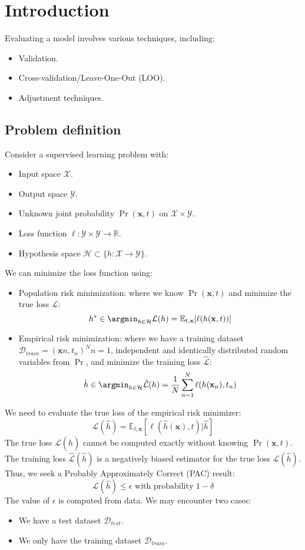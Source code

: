\section{Introduction}

Evaluating a model involves various techniques, including:
\begin{itemize}
    \item Validation.
    \item Cross-validation/Leave-One-Out (LOO).
    \item Adjustment techniques.
\end{itemize}

\subsection{Problem definition}
Consider a supervised learning problem with:
\begin{itemize}
    \item Input space $\mathcal{X}$.
    \item Output space $\mathcal{Y}$.
    \item Unknown joint probability $\Pr(\mathbf{x}, t)$ on $\mathcal{X} \times \mathcal{Y}$.
    \item Loss function $\ell: \mathcal{Y} \times \mathcal{Y}\rightarrow \mathbb{R}$.
    \item Hypothesis space $\mathcal{H} \subset \{h : \mathcal{X} \rightarrow \mathcal{Y}\}$.
\end{itemize}
We can minimize the loss function using:
\begin{itemize}
    \item Population risk minimization: where we know $\Pr(\mathbf{x}, t)$ and minimize the true loss $\mathcal{L}$:
        \[h^\ast\in\argmin_{h\in\mathcal{H}}\mathcal{L}(h)=\mathbb{E}_{t,\mathbf{x}}[\ell(h(\mathbf{x},t))]\]
    \item Empirical risk minimization: where we have a training dataset $\mathcal{D}_{train}={(\mathbf{x}n, t_n)}^N{n=1}$, independent and identically distributed random variables from $\Pr$, and minimize the training loss $\hat{\mathcal{L}}$:
        \[\hat{h}\in\argmin_{h\in\mathcal{H}}\hat{\mathcal{L}}(h)=\dfrac{1}{N}\sum_{n=1}^{N}\ell(h(\mathbf{x}_n),t_n)\]
\end{itemize}
We need to evaluate the true loss of the empirical risk minimizer:
\[\mathcal{L}(\hat{h})=\mathbb{E}_{t,\mathbf{x}}[\ell(\hat{h}(\mathbf{x}),t)|\hat{h}]\]
The true loss $\mathcal{L}(\hat{h})$ cannot be computed exactly without knowing $\Pr(\mathbf{x}, t)$. 
The training loss $\hat{\mathcal{L}}(\hat{h})$ is a negatively biased estimator for the true loss $\mathcal{L}(\hat{h})$. 
Thus, we seek a Probably Approximately Correct (PAC) result:
\[\mathcal{L}(\hat{h})\leq\epsilon\text{ with probability }1-\delta \]
The value of $\epsilon$ is computed from data. 
We may encounter two cases:
\begin{itemize}
    \item We have a test dataset $\mathcal{D}_{test}$.
    \item We only have the training dataset $\mathcal{D}_{train}$.
\end{itemize}